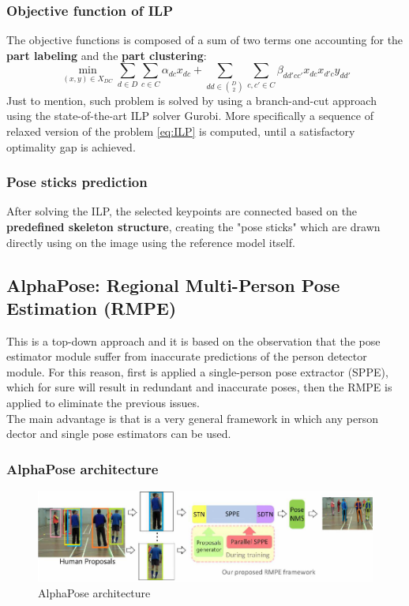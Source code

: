 \subsubsection*{\textsf{Objective function of ILP}}
The objective functions is composed of a sum of two terms one accounting for the \textbf{part labeling} and the \textbf{part clustering}: 
\begin{equation}\label{eq:ILP}
    \min_{(x,y)\in{X_{DC}}} {
        \sum_{d\in{D}}\sum_{c\in{C}} \alpha_{dc}x_{dc} 
    }+
    {
        \sum_{dd\in\binom{D}{2}} \sum_{c,c'\in{C}} \beta_{dd'cc'} x_{dc}x_{d'c}y_{dd'}
    }
\end{equation}
Just to mention, such problem is solved by using a branch-and-cut approach using the state-of-the-art ILP solver Gurobi. More specifically a sequence of relaxed version of the problem \ref{eq:ILP} is computed, until a satisfactory optimality gap is achieved.

\subsubsection*{\textsf{Pose sticks prediction}}
After solving the ILP, the selected keypoints are connected based on the \textbf{predefined skeleton structure}, creating the "pose sticks" which are drawn directly using on the image using the reference model itself.
 
\subsection{AlphaPose: Regional Multi-Person Pose Estimation (RMPE)}
This is a top-down approach and it is based on the observation that the pose estimator module suffer from inaccurate predictions of the person detector module. For this reason, first is applied a single-person pose extractor (SPPE), which for sure will result in redundant and inaccurate poses, then the RMPE is applied to eliminate the previous issues. \\
The main advantage is that is a very general framework in which any person dector and single pose estimators can be used.

\subsubsection{AlphaPose architecture}
\begin{figure}[h]
    \centering
    \includegraphics[scale=0.9]{img/AlphaPoseArch.png}
    \caption{AlphaPose architecture}
\end{figure}

